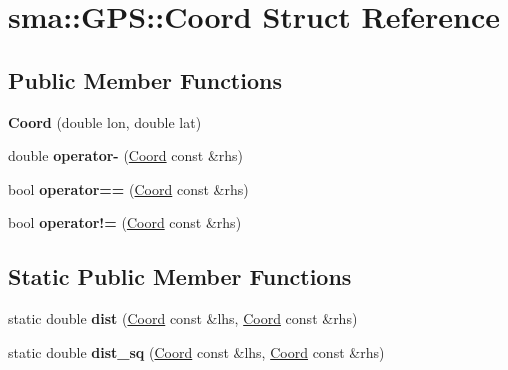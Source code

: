\hypertarget{structsma_1_1GPS_1_1Coord}{\section{sma\-:\-:G\-P\-S\-:\-:Coord Struct Reference}
\label{structsma_1_1GPS_1_1Coord}
}
\subsection*{Public Member Functions}
\begin{DoxyCompactItemize}
\item 
\hypertarget{structsma_1_1GPS_1_1Coord_a58449254e9828e90d7c4d07e71d847d0}{{\bfseries Coord} (double lon, double lat)}\label{structsma_1_1GPS_1_1Coord_a58449254e9828e90d7c4d07e71d847d0}

\item 
\hypertarget{structsma_1_1GPS_1_1Coord_adf3d6c4b5e3885e05e892782b5d0a3c0}{double {\bfseries operator-\/} (\hyperlink{structsma_1_1GPS_1_1Coord}{Coord} const \&rhs)}\label{structsma_1_1GPS_1_1Coord_adf3d6c4b5e3885e05e892782b5d0a3c0}

\item 
\hypertarget{structsma_1_1GPS_1_1Coord_a83d6dc98c9058cec0f8fc59cefe293c0}{bool {\bfseries operator==} (\hyperlink{structsma_1_1GPS_1_1Coord}{Coord} const \&rhs)}\label{structsma_1_1GPS_1_1Coord_a83d6dc98c9058cec0f8fc59cefe293c0}

\item 
\hypertarget{structsma_1_1GPS_1_1Coord_a1dcb63bbd829fd964db09f46386e0873}{bool {\bfseries operator!=} (\hyperlink{structsma_1_1GPS_1_1Coord}{Coord} const \&rhs)}\label{structsma_1_1GPS_1_1Coord_a1dcb63bbd829fd964db09f46386e0873}

\end{DoxyCompactItemize}
\subsection*{Static Public Member Functions}
\begin{DoxyCompactItemize}
\item 
\hypertarget{structsma_1_1GPS_1_1Coord_acc89bcab41f37260ef108f5590224a6f}{static double {\bfseries dist} (\hyperlink{structsma_1_1GPS_1_1Coord}{Coord} const \&lhs, \hyperlink{structsma_1_1GPS_1_1Coord}{Coord} const \&rhs)}\label{structsma_1_1GPS_1_1Coord_acc89bcab41f37260ef108f5590224a6f}

\item 
\hypertarget{structsma_1_1GPS_1_1Coord_a2e322a3941d5168e25c30566385afe97}{static double {\bfseries dist\-\_\-sq} (\hyperlink{structsma_1_1GPS_1_1Coord}{Coord} const \&lhs, \hyperlink{structsma_1_1GPS_1_1Coord}{Coord} const \&rhs)}\label{structsma_1_1GPS_1_1Coord_a2e322a3941d5168e25c30566385afe97}

\end{DoxyCompactItemize}
